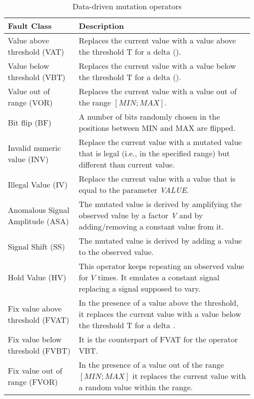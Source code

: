 

\begin{table*}[tb]
\caption{Data-driven mutation operators}
\label{table:operators}
\scriptsize
\begin{tabular}{|p{40mm}|p{90mm}|}
\hline
\textbf{Fault Class}&\textbf{Description}\\
\hline
Value above threshold (VAT)&
Replaces the current value with a value above the threshold T for a delta (\D). 
\\
\hline
Value below threshold (VBT)&
Replaces the current value with a value below the threshold T for a delta (\D). 
\\
\hline
Value out of range (VOR)&
Replaces the current value with a value out of the range $[MIN;MAX]$.\\
\hline
Bit flip (BF)&
A number of bits randomly chosen in the positions between MIN and MAX are flipped.
\\
\hline
Invalid numeric value (INV)&
Replace the current value with a mutated value that is legal (i.e., in the specified range) but different than current value. 
\\
\hline
Illegal Value (IV)
&
Replace the current value with a value that is equal to the parameter \emph{VALUE}. 
\\
\hline
Anomalous Signal Amplitude (ASA)
&
The mutated value is derived by amplifying the observed value by a factor \emph{V} and by adding/removing a constant value \D from it. 
\\
\hline
Signal Shift (SS)
&
The mutated value is derived by adding a value \D to the observed value. 
\\
\hline
Hold Value (HV)
&
This operator keeps repeating an observed value for $V$ times. It emulates a constant signal replacing a signal supposed to vary.
\\
\hline
Fix value above threshold (FVAT)&
In the presence of a value above the threshold, it replaces the current value with a value below the threshold T for a delta \D. 
\\
\hline
Fix value below threshold (FVBT)&
It is the counterpart of FVAT for the operator VBT.
\\
\hline
Fix value out of range (FVOR)&
In the presence of a value out of the range  $[MIN;MAX]$ it replaces the current value with a random value within the range. 
\\
\hline
\end{tabular}
\end{table*}%
